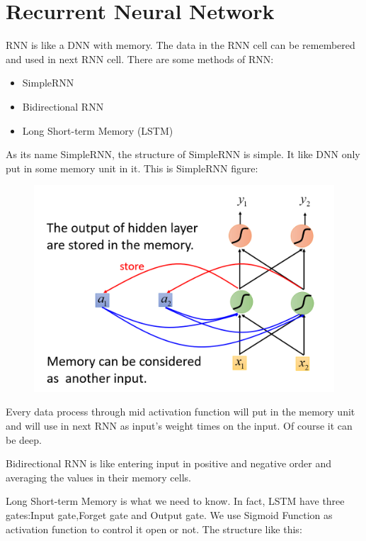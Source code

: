 \documentclass{article}
\begin{document}
\section{Recurrent Neural Network}

RNN is like a DNN with memory. The data in the RNN cell can be remembered and used in next RNN cell. There are some methods of RNN:

\begin{itemize}
    \item SimpleRNN
    \item Bidirectional RNN
    \item Long Short-term Memory (LSTM)
\end{itemize}


As its name SimpleRNN, the structure of SimpleRNN is simple. It like DNN only put in some memory unit in it. This is SimpleRNN figure:

\newpage

\begin{figure}[htbp]
  \centering
  \includegraphics[scale=0.5]{pic/srnn.png}
  \label{fig:my_label}
\end{figure}

Every data process through mid activation function will put in the memory unit and will use in next RNN as input's weight times on the input. Of course it can be deep.

Bidirectional RNN is like entering input in positive and negative order and averaging the values in their memory cells.

Long Short-term Memory is what we need to know. In fact, LSTM have three gates:Input gate,Forget gate and Output gate. We use Sigmoid Function as activation function to control it open or not. The structure like this:
\end{document}

